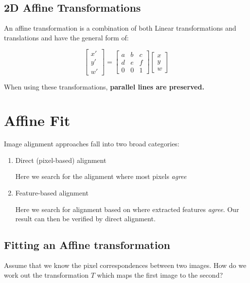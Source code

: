 \documentclass{article}
\begin{document}
\subsection{2D Affine Transformations}

An affine transformation is a combination of both Linear transformations and translations and have the general form of:

\[
  \begin{bmatrix}
    x' \\ y' \\ w'
  \end{bmatrix} =
  \begin{bmatrix}
    a & b & c \\
    d & e & f \\
    0 & 0 & 1
  \end{bmatrix}\begin{bmatrix}
    x \\ y \\ w
  \end{bmatrix}
\]

When using these transformations, \textbf{parallel lines are preserved.}


\section{Affine Fit}

Image alignment approaches fall into two broad categories:

\begin{enumerate}
  \item Direct (pixel-based) alignment

        Here we search for the alignment where most pixels \textit{agree}


  \item Feature-based alignment

        Here we search for alignment based on where extracted features \textit{agree}. Our result can then be verified by direct alignment.
\end{enumerate}

\subsection{Fitting an Affine transformation}

Assume that we know the pixel correspondences between two images. How do we work out the transformation $T$ which maps the first image to the second?
\end{document}

